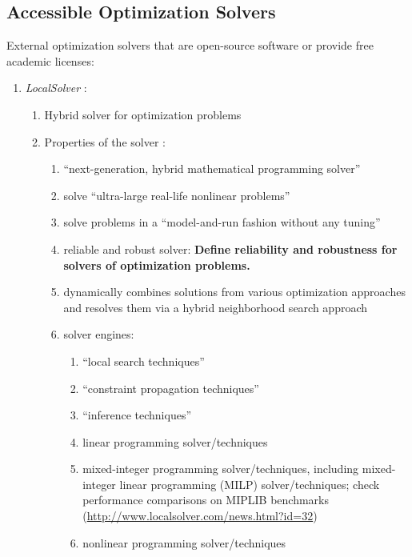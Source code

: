\subsection{Accessible Optimization Solvers}
\label{ssec:AccessibleOptimizationSolvers}

External optimization solvers that are open-source software or provide free academic licenses: \vspace{-0.3cm}
\begin{enumerate} \itemsep -4pt
\item {\it LocalSolver} \cite{Innovation24Staff2015}: \vspace{-0.3cm}
	\begin{enumerate} \itemsep -2pt
	\item Hybrid solver for optimization problems
	\item Properties of the solver \cite[Product: Overview]{Innovation24Staff2015}: \vspace{-0.2cm}
		\begin{enumerate} \itemsep -2pt
		\item ``next-generation, hybrid mathematical programming solver''
		\item solve ``ultra-large real-life nonlinear problems''
		\item solve problems in a ``model-and-run fashion without any tuning''
		\item reliable and robust solver: {\bf Define reliability and robustness for solvers of optimization problems.}
		\item dynamically combines solutions from various optimization approaches and resolves them via a hybrid neighborhood search approach
		\item solver engines: \vspace{-0.1cm}
			\begin{enumerate} \itemsep -1pt
			\item ``local search techniques''
			\item ``constraint propagation techniques''
			\item ``inference techniques''
			\item linear programming solver/techniques
			\item mixed-integer programming solver/techniques, including mixed-integer linear programming (MILP) solver/techniques; check performance comparisons on {MIPLIB} benchmarks (\url{http://www.localsolver.com/news.html?id=32})
			\item nonlinear programming solver/techniques

\end{enumerate}
\end{enumerate}
\end{enumerate}
\end{enumerate}
